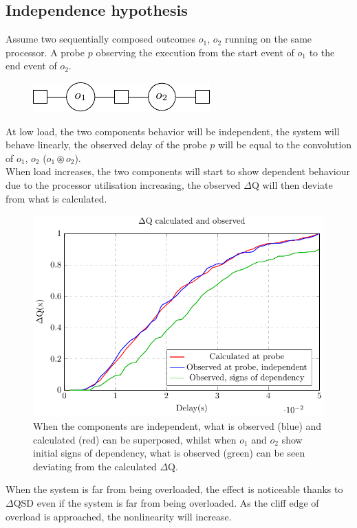     \subsection{Independence hypothesis}
        
        Assume two sequentially composed outcomes $o_1$, $o_2$ running on the same processor. A probe $p$ observing the execution from the start event of $o_1$ to the end event of $o_2$. 
        \begin{figure}[H]
            \begin{center}
                \includegraphics{tikz/indep.pdf}
            \end{center}
        \end{figure}
        
        At low load, the two components behavior will be independent, the system will behave linearly, the observed delay of the probe $p$ will be equal to the convolution of $o_1$, $o_2$ ($o_1 \circledast o_2$). \\
        When load increases, the two components will start to show dependent behaviour due to the processor utilisation increasing, the observed $\Delta$Q will then deviate from what is calculated.
        \begin{figure}[H]
            \begin{center}
                \includegraphics[scale=1.2]{tikz/cdf_indep.pdf}
            \end{center}
            \caption{When the components are independent, what is observed (blue) and calculated (red) can be superposed, whilst when $o_1$ and $o_2$ show initial signs of dependency, what is observed (green) can be seen deviating from the calculated $\Delta$Q.}
        \end{figure}
        When the system is far from being overloaded, the effect is noticeable thanks to $\Delta$QSD even if the system is far from being overloaded. As the cliff edge of overload is approached, the nonlinearity will increase.
